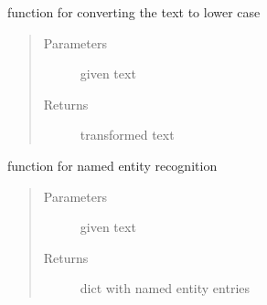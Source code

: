 \documentclass[letterpaper,10pt,english]{sphinxmanual}
\begin{document}
\begin{fulllineitems}
\label{\detokenize{index:data_preprocessing.data_preprocessing_functions.lower_text}}
\sphinxAtStartPar
function for converting the text to lower case
\begin{quote}\begin{description}
\item[{Parameters}] \leavevmode
\sphinxAtStartPar
{} \textendash{} given text

\item[{Returns}] \leavevmode
\sphinxAtStartPar
transformed text

\end{description}\end{quote}

\end{fulllineitems}


\begin{fulllineitems}
\label{\detokenize{index:data_preprocessing.data_preprocessing_functions.named_entity_recognition}}
\sphinxAtStartPar
function for named entity recognition
\begin{quote}\begin{description}
\item[{Parameters}] \leavevmode
\sphinxAtStartPar
{} \textendash{} given text

\item[{Returns}] \leavevmode
\sphinxAtStartPar
dict with named entity entries

\end{description}\end{quote}

\end{fulllineitems}

\end{document}
